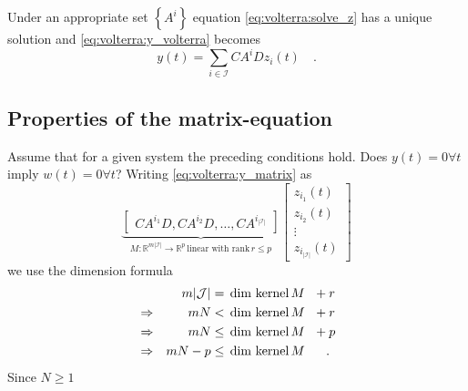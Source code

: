 Under an appropriate set $\left\{A^i \right\}$ equation 
\eqref{eq:volterra:solve_z} has a unique solution and 
\eqref{eq:volterra:y_volterra} becomes
\begin{equation}
y(t) = \sum\limits_{i\in \mathcal{I}} CA^iD z_i(t) \quad . \label{eq:volterra:y_matrix}
\end{equation}

\subsection*{Properties of the matrix-equation}
Assume that for a given system the preceding conditions hold. Does $y(t)=0\forall t$ 
imply $w(t)=0\forall t$? Writing \eqref{eq:volterra:y_matrix} as
\begin{equation}
\underbrace{\begin{bmatrix}CA^{i_1}D, CA^{i_2}D,\ldots,CA^{i_{|\mathcal{I}|} } \end{bmatrix}}_{M:\mathbb{R}^{m|\mathcal{I}|}\rightarrow \mathbb{R}^p \, \text{linear with rank}\,
r \leq p} 
\begin{bmatrix}
z_{i_1}(t) \\ z_{i_2}(t) \\ \vdots \\ z_{i_{|\mathcal{I}|}}(t) 
\end{bmatrix}
\end{equation}
we use the dimension formula
\begin{align}
&& m|\mathcal{J}| &=  \, \text{dim}\, \, \text{kernel}\,M \,\, \,\, + r \\
&\Rightarrow& m N &<  \, \text{dim}\, \, \text{kernel}\,M \,\, \,\, + r \\
&\Rightarrow& m N &\leq  \, \text{dim}\, \, \text{kernel}\,M \,\, \,\, + p \\
&\Rightarrow& m N - p &\leq  \, \text{dim}\, \, \text{kernel}\,M \,\, \,\, \quad .
\end{align}
Since $N \geq 1$ 